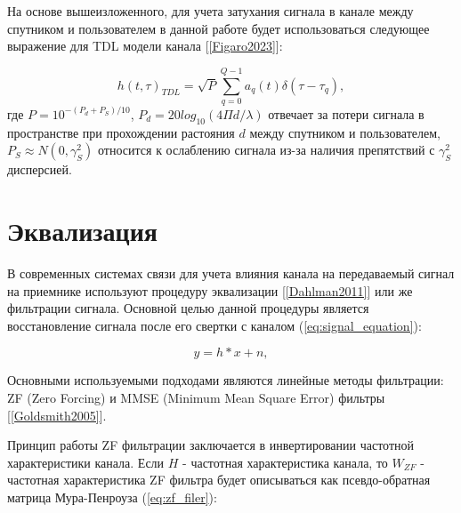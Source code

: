 На основе вышеизложенного, для учета затухания сигнала в канале между спутником и пользователем в данной работе
будет использоваться следующее выражение для TDL модели канала [\ref{Figaro2023}]:

\begin{equation}
    h(t, \tau)_{TDL} = \sqrt{P} \sum_{q = 0}^{Q - 1} a_q(t) \delta (\tau - \tau_q),
    \label{eq:tdl_channel}
\end{equation}
\noindent где $P = 10^{-(P_d + P_S)/10}$, $P_d = 20log_{10} (4 \Pi d / \lambda)$ отвечает за 
потери сигнала в пространстве при прохождении растояния $d$ между спутником и пользователем,
$P_S \approx N(0, \gamma^2_S)$ относится к ослаблению сигнала из-за наличия препятствий с $\gamma^2_S$ дисперсией.

\section{Эквализация}

В современных системах связи для учета влияния канала на передаваемый сигнал на приемнике
используют процедуру эквализации [\ref{Dahlman2011}] или же фильтрации сигнала.
Основной целью данной процедуры является восстановление сигнала после его свертки с каналом (\ref{eq:signal_equation}):

\begin{equation}
    y = h * x + n,
    \label{eq:signal_equation}
\end{equation}

Основными используемыми подходами являются линейные методы фильтрации: ZF (Zero Forcing) и MMSE (Minimum Mean Square Error) фильтры [\ref{Goldsmith2005}].

Принцип работы ZF фильтрации заключается в инвертировании частотной характеристики канала. Если $H$ - частотная
характеристика канала, то $W_{ZF}$ - частотная характеристика ZF фильтра будет описываться как псевдо-обратная матрица
Мура-Пенроуза (\ref{eq:zf_filer}):

